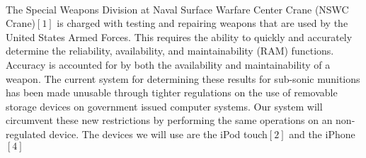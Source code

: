 \paragraph{} The Special Weapons Division at Naval Surface Warfare Center Crane (NSWC Crane)$[1]$ is charged with testing and repairing weapons that are used by the United States Armed Forces. This requires the ability to quickly and accurately determine the reliability, availability, and maintainability (RAM) functions. Accuracy is accounted for by both the availability and maintainability of a weapon. The current system for determining these results for sub-sonic munitions has been made unusable through tighter regulations on the use of removable storage devices on government issued computer systems. Our system will circumvent these new restrictions by performing the same operations on an non-regulated device. The devices we will use are the iPod touch$[2]$ and the iPhone$[4]$